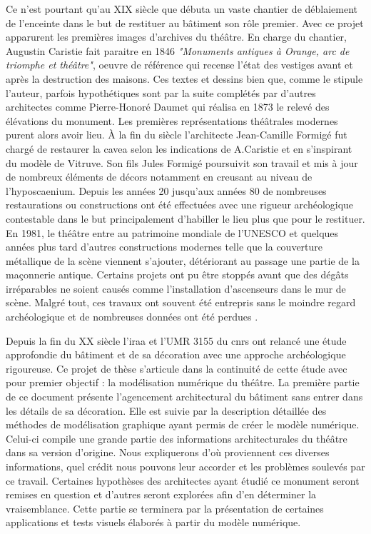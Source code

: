 			 Ce n'est pourtant qu'au XIX siècle que débuta un vaste chantier de déblaiement de l'enceinte dans le but de restituer au bâtiment son rôle premier. Avec ce projet apparurent les premières images d'archives du théâtre. En charge du chantier, Augustin Caristie fait paraitre en 1846 \textit{"Monuments antiques à Orange, arc de triomphe et théâtre"}, oeuvre de référence qui recense l'état des vestiges avant et après la destruction des maisons. Ces textes et dessins bien que, comme le stipule l'auteur, parfois hypothétiques sont par la suite complétés par d'autres architectes comme Pierre-Honoré Daumet qui réalisa en 1873 le relevé des élévations du monument. Les premières représentations théâtrales modernes purent alors avoir lieu. \`{A} la fin du siècle l'architecte Jean-Camille Formigé fut chargé de restaurer la \gls{cavea} selon les indications de A.Caristie et en s'inspirant du modèle de Vitruve. Son fils Jules Formigé poursuivit son travail et mis à jour de nombreux éléments de décors notamment en creusant au niveau de l'\gls{hyposcaenium}. Depuis les années 20 jusqu'aux années 80 de nombreuses restaurations ou constructions ont été effectuées avec une rigueur archéologique contestable dans le but principalement d'habiller le lieu plus que pour le restituer. En 1981, le théâtre entre au patrimoine mondiale de l'UNESCO et quelques années plus tard d'autres constructions modernes telle que la couverture métallique de la scène viennent s'ajouter, détériorant au passage une partie de la maçonnerie antique. Certains projets ont pu être stoppés avant que des dégâts irréparables ne soient causés comme l'installation d'ascenseurs dans le mur de scène. Malgré tout, ces travaux ont souvent été entrepris sans le moindre regard archéologique et de nombreuses données ont été perdues \cite[p 231- 236]{carteArcheo}.

			 
			 Depuis la fin du XX siècle l'\gls{iraa} et l'UMR 3155 du \gls{cnrs} ont relancé une étude approfondie du bâtiment et de sa décoration avec une approche archéologique rigoureuse. Ce projet de thèse s'articule dans la continuité de cette étude avec pour premier objectif : la modélisation numérique du théâtre. La première partie de ce document présente l'agencement architectural du bâtiment sans entrer dans les détails de sa décoration. Elle est suivie par la description détaillée des méthodes de modélisation graphique ayant permis de créer le modèle numérique. Celui-ci compile une grande partie des informations architecturales du théâtre dans sa version d'origine. Nous expliquerons d'où proviennent ces diverses informations, quel crédit nous pouvons leur accorder et les problèmes soulevés par ce travail. Certaines hypothèses des architectes ayant étudié ce monument seront remises en question et d'autres seront explorées afin d'en déterminer la vraisemblance. Cette partie se terminera par la présentation de certaines applications et tests visuels élaborés à partir du modèle numérique.
			 
